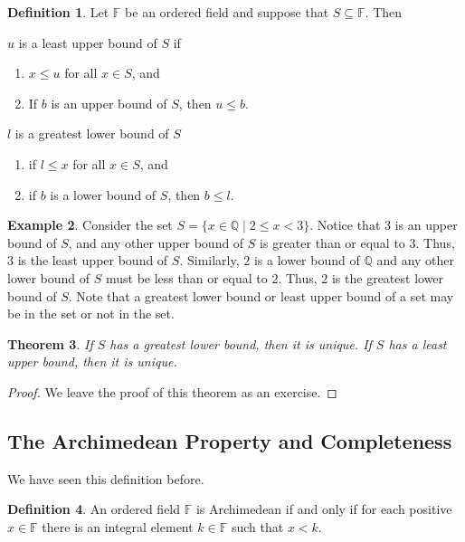 \documentclass[11pt]{article}
\newtheorem{theorem}{Theorem}[section]
\theoremstyle{definition}
\newtheorem{definition}[theorem]{Definition}
\newtheorem{example}[theorem]{Example}
\begin{document}
\begin{definition}
  Let $\mathbb{F}$ be an ordered field and suppose that $S\subseteq \mathbb{F}$. Then
    \item $u$ is a least upper bound of $S$ if 
      \begin{enumerate}
        \item $x \leq u$ for all $x\in S$, and
        \item If $b$ is an upper bound of $S$, then $u\leq b$. 
      \end{enumerate}
    \item $l$ is a greatest lower bound of $S$ 
      \begin{enumerate}
        \item if $l \leq x$ for all $x\in S$, and
        \item if $b$ is a lower bound of $S$, then $b \leq l$.
      \end{enumerate}
\end{definition}

\begin{example}
  Consider the set $S = \{ x \in \mathbb{Q} \mid 2 \leq x < 3 \}$. Notice that
  $3$ is an upper bound of $S$, and any other upper bound of $S$ is greater than or 
  equal to $3$. Thus, $3$ is the least upper bound of $S$. Similarly, $2$ is a lower 
  bound of $\mathbb{Q}$ and any other lower bound of $S$ must be less than or
  equal to $2$. Thus, $2$ is the greatest lower bound of $S$.  Note that a greatest 
  lower bound or least upper bound of a set may be in the set or not in the set.
\end{example}

\begin{theorem}
  If $S$ has a greatest lower bound, then it is unique. If $S$ has a least upper bound, then it is unique.
  \label{theorem: glb and lub are unqiue}
\end{theorem}
\begin{proof}
  We leave the proof of this theorem as an exercise.
\end{proof}

\subsection{The Archimedean Property and Completeness}

We have seen this definition before.

\begin{definition}
  An ordered field $\mathbb{F}$ is Archimedean if and only if for each positive $x\in\mathbb{F}$ there is an integral 
  element $k\in\mathbb{F}$ such that $x < k$.
\end{definition}
\end{document}
